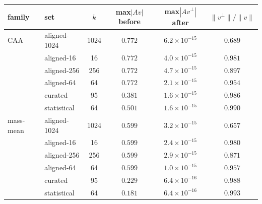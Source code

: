 \begin{tabular}{llcccc}
\toprule
family & set & $k$ & max$|Av|$ before & max$|Av^{\perp}|$ after & $\|v^{\perp}\|/\|v\|$ \\
\midrule
CAA & aligned-1024 & 1024 & $0.772$ & $6.2\times 10^{-15}$ & $0.689$ \\
 & aligned-16 & 16 & $0.772$ & $4.0\times 10^{-15}$ & $0.981$ \\
 & aligned-256 & 256 & $0.772$ & $4.7\times 10^{-15}$ & $0.897$ \\
 & aligned-64 & 64 & $0.772$ & $2.1\times 10^{-15}$ & $0.954$ \\
 & curated & 95 & $0.381$ & $1.6\times 10^{-15}$ & $0.986$ \\
 & statistical & 64 & $0.501$ & $1.6\times 10^{-15}$ & $0.990$ \\
\midrule
mass-mean & aligned-1024 & 1024 & $0.599$ & $3.2\times 10^{-15}$ & $0.657$ \\
 & aligned-16 & 16 & $0.599$ & $2.4\times 10^{-15}$ & $0.980$ \\
 & aligned-256 & 256 & $0.599$ & $2.9\times 10^{-15}$ & $0.871$ \\
 & aligned-64 & 64 & $0.599$ & $1.0\times 10^{-15}$ & $0.957$ \\
 & curated & 95 & $0.229$ & $6.4\times 10^{-16}$ & $0.988$ \\
 & statistical & 64 & $0.181$ & $6.4\times 10^{-16}$ & $0.993$ \\
\bottomrule
\end{tabular}
